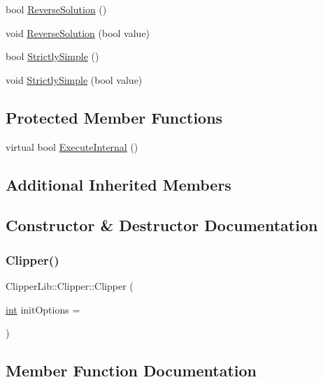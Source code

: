 \begin{DoxyCompactItemize}
\item 
bool \mbox{\hyperlink{class_clipper_lib_1_1_clipper_ad556ba9961f498de02d55dc95bc5a889}{Reverse\+Solution}} ()
\item 
void \mbox{\hyperlink{class_clipper_lib_1_1_clipper_a44afc0c82a1d2607829b5fd21f7644ef}{Reverse\+Solution}} (bool value)
\item 
bool \mbox{\hyperlink{class_clipper_lib_1_1_clipper_a50eb4c514466ed37fd365769e0bcf67b}{Strictly\+Simple}} ()
\item 
void \mbox{\hyperlink{class_clipper_lib_1_1_clipper_a85aa82d75e0d7d1f380d2e96231d6aa3}{Strictly\+Simple}} (bool value)
\end{DoxyCompactItemize}
\subsection*{Protected Member Functions}
\begin{DoxyCompactItemize}
\item 
virtual bool \mbox{\hyperlink{class_clipper_lib_1_1_clipper_a3e8757e5f8a6ffcb7fd0f9630fde02d3}{Execute\+Internal}} ()
\end{DoxyCompactItemize}
\subsection*{Additional Inherited Members}


\subsection{Constructor \& Destructor Documentation}
\mbox{\label{class_clipper_lib_1_1_clipper_adceb8536f6a80e8f115213dba9208427}} 
\subsubsection{\texorpdfstring{Clipper()}{Clipper()}}
{\footnotesize\ttfamily Clipper\+Lib\+::\+Clipper\+::\+Clipper (\begin{DoxyParamCaption}\item[{\mbox{\hyperlink{draw_8hh_aa620a13339ac3a1177c86edc549fda9b}{int}}}]{init\+Options = {} }\end{DoxyParamCaption})}



\subsection{Member Function Documentation}
\mbox{\label{class_clipper_lib_1_1_clipper_a2e4a15e6f79a5f583b42c9701b839e01}} 
